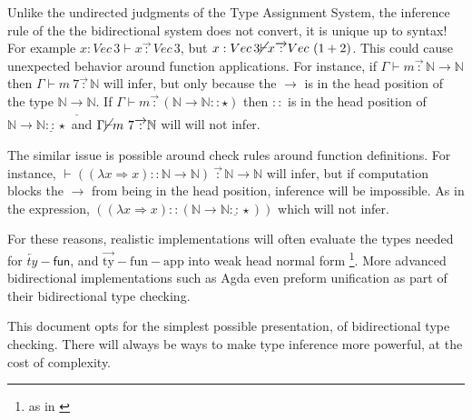 Unlike the undirected judgments of the Type Assignment System, the
inference rule of the the bidirectional system does not convert, it
is unique up to syntax! For example $x:Vec\,3\vdash x\overrightarrow{\,:\,}Vec\,3$,
but $x:Vec\,3\cancel{\vdash}x\overrightarrow{\,:\,}Vec\,\left(1+2\right)$.
This could cause unexpected behavior around function applications.
For instance, if $\Gamma\vdash m\overrightarrow{\,:\,}\mathbb{N}\rightarrow\mathbb{N}$
then $\Gamma\vdash m\:7\overrightarrow{\,:\,}\mathbb{N}$ will infer,
but only because the $\rightarrow$ is in the head position of the
type $\mathbb{N}\underline{\rightarrow}\mathbb{N}$. If $\Gamma\vdash m\overrightarrow{\,:\,}\left(\mathbb{N}\rightarrow\mathbb{N}::\star\right)$
then $::$ is in the head position of $\mathbb{N}\rightarrow\mathbb{N}\underline{::}\star$
and $\Gamma\cancel{\vdash}m\ 7\overrightarrow{\,:\,}\mathbb{N}$ will
will not infer.

The similar issue is possible around check rules around function definitions.
For instance, $\vdash\left((\lambda x\Rightarrow x)::\mathbb{N}\rightarrow\mathbb{N}\right)\ \overrightarrow{\,:\,}\mathbb{N}\rightarrow\mathbb{N}$
will infer, but if computation blocks the $\rightarrow$ from being
in the head position, inference will be impossible. As in the expression,
$\left((\lambda x\Rightarrow x)::\left(\mathbb{N}\rightarrow\mathbb{N}\underline{::}\star\right)\right)$
which will not infer. 

For these reasons, realistic implementations will often evaluate the
types needed for $\overleftarrow{ty}-\mathsf{fun}$, and $\operatorname{\overrightarrow{ty}-fun-app}$
into weak head normal form \footnote{as in \cite{COQUAND1996167}}.
More advanced bidirectional implementations such as Agda\cite{norell2007towards}
even preform unification as part of their bidirectional type checking.





This document opts for the simplest possible presentation, of bidirectional
type checking. There will always be ways to make type inference more
powerful, at the cost of complexity.

